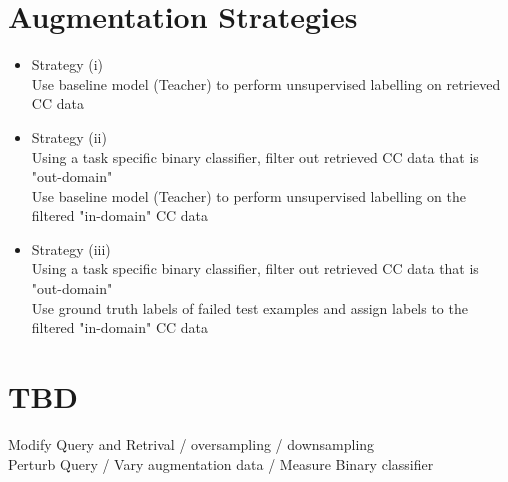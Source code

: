 \documentclass[twocolumn]{article}
\begin{document}
\section{Augmentation Strategies}
\label{sec:org741e1ee}
\begin{itemize}
\item Strategy (i)\\
Use baseline model (Teacher) to perform unsupervised labelling on retrieved CC data
\item Strategy (ii)\\
Using a task specific binary classifier, 
filter out retrieved CC data that is "out-domain"\\
Use baseline model (Teacher) to perform unsupervised labelling on the filtered "in-domain" CC data
\item Strategy (iii)\\
Using a task specific binary classifier, 
filter out retrieved CC data that is "out-domain"\\
Use ground truth labels of failed test examples and assign labels to the filtered "in-domain" CC data
\end{itemize}


\section{TBD}
\label{sec:orga8bed3e}
Modify Query and Retrival / oversampling / downsampling \\
Perturb Query / Vary augmentation data / Measure Binary classifier
\end{document}

